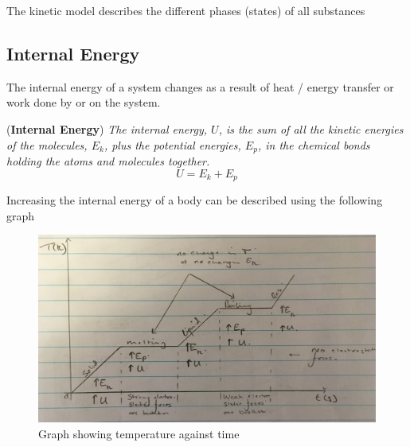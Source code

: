 The kinetic model describes the different phases (states) of all substances

\begin{table}[h!]
\end{table}
\FloatBarrier

\subsection{Internal Energy}

The internal energy of a system changes as a result of heat / energy transfer or work done by or on the system.

\begin{definition}{(\textbf{Internal Energy})}
\textit{The internal energy, $U$, is the sum of all the kinetic energies of the molecules, $E_k$, plus the potential energies, $E_p$, in the chemical bonds holding the atoms and molecules together.}
\begin{equation}
    U = E_k + E_p
\end{equation}
\end{definition}

Increasing the internal energy of a body can be described using the following graph
\begin{figure}[h!]
    \centering
    \includegraphics[scale=0.09]{notes/images/Internal-Energy-Graph-Rotated.JPG}
    \caption{Graph showing temperature against time}
\end{figure}
\FloatBarrier


